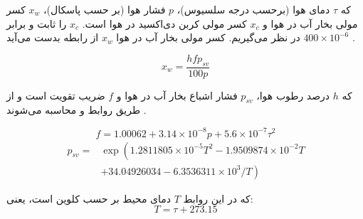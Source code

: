 که $\tau$ دمای هوا (برحسب درجه سلسیوس)، $p$ فشار هوا (بر حسب پاسکال)، $x_w$ کسر مولی بخار آب در هوا و $x_c$ کسر مولی کربن دی‌اکسید در هوا است. $x_c$ را ثابت و برابر $400 \times 10^{-6}$ در نظر می‌گیریم. کسر مولی بخار آب در هوا $x_w$ از رابطه  بدست می‌آید . 

\begin{equation}\label{eq:x_w}
	x_w=\frac{h f p_{sv}}{100 p}
\end{equation}

که $h$ درصد رطوب هوا، $p_{sv}$ فشار اشباع بخار آب در هوا و $f$ ضریب تقویت است و از طریق روابط 
 و  محاسبه می‌شوند .

\begin{equation}\label{eq:f}
	f=1.00062+3.14 \times 10^{-8} p+5.6 \times 10^{-7} \tau^{2}
\end{equation}
\begin{equation}\label{eq:p_sv}
	\begin{aligned}
		p_{s v}=& \exp \left(1.2811805 \times 10^{-5} T^{2}-1.9509874 \times 10^{-2} T\right.\\
		&\left.+34.04926034-6.3536311 \times 10^{3} / T\right)
	\end{aligned}
\end{equation}

که در این روابط $T$ دمای محیط بر حسب کلوین است، یعنی:
\begin{equation}
	T = \tau + 273.15
\end{equation}



